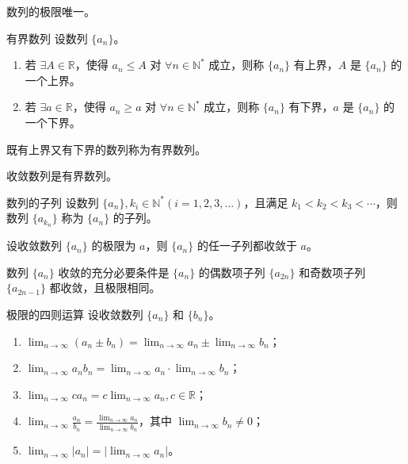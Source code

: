\begin{theorem}
    数列的极限唯一。
\end{theorem}

\begin{definition}{有界数列}
    设数列 $\{a_n\}$。
    \begin{enumerate}
        \item 若 $\exists A \in \mathbb{R}$，使得 $a_n \leqslant A$ 对 $\forall n \in \mathbb{N}^*$ 成立，则称 $\{a_n\}$ 有上界，$A$ 是 $\{a_n\}$ 的一个上界。
        \item 若 $\exists a \in \mathbb{R}$，使得 $a_n \geqslant a$ 对 $\forall n \in \mathbb{N}^*$ 成立，则称 $\{a_n\}$ 有下界，$a$ 是 $\{a_n\}$ 的一个下界。
    \end{enumerate}
    既有上界又有下界的数列称为有界数列。
\end{definition}

\begin{theorem}
    收敛数列是有界数列。
\end{theorem}

\begin{definition}{数列的子列}
    设数列 $\{a_n\}, k_i \in \mathbb{N}^*(i = 1,2,3, \ldots)$，且满足 $k_1 < k_2 < k_3 < \cdots$，则数列 $\{a_{k_n}\}$ 称为 $\{a_n\}$ 的子列。
\end{definition}

\begin{theorem}
    设收敛数列 $\{a_n\}$ 的极限为 $a$，则 $\{a_n\}$ 的任一子列都收敛于 $a$。
\end{theorem}

\begin{corollary}
    数列 $\{a_n\}$ 收敛的充分必要条件是 $\{a_n\}$ 的偶数项子列 $\{a_{2n}\}$ 和奇数项子列 $\{a_{2n - 1}\}$ 都收敛，且极限相同。
\end{corollary}

\begin{theorem}{极限的四则运算}
    设收敛数列 $\{a_n\}$ 和 $\{b_n\}$。
    \begin{enumerate}[itemsep=0.5em]
        \item $\displaystyle \lim_{n \to \infty}(a_n \pm b_n) = \lim_{n \to \infty}a_n \pm \lim_{n \to \infty}b_n$；
        \item $\displaystyle \lim_{n \to \infty}a_{n}b_{n} = \lim_{n \to \infty}a_n \cdot \lim_{n \to \infty}b_n$；
        \item $\displaystyle \lim_{n \to \infty}ca_n = c\lim_{n \to \infty}a_n, c\in \mathbb{R}$；
        \item $\displaystyle \lim_{n \to \infty}\frac{a_n}{b_n} = \frac{\displaystyle \lim_{n \to \infty}a_n}{\displaystyle \lim_{n \to \infty}b_n}$，其中 $\displaystyle \lim_{n \to \infty}b_n \ne 0$；
        \item $\displaystyle \lim_{n \to \infty}|a_n| = |\lim_{n \to \infty}a_n|$。
    \end{enumerate}
\end{theorem}

